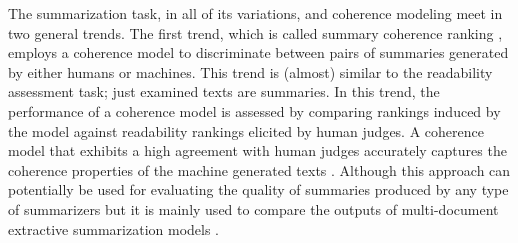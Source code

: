 The summarization task, in all of its variations, and coherence modeling meet in two general trends. 
The first trend, which is called summary coherence ranking \cite{barzilay08,guinaudeau13}, employs a coherence model to discriminate between pairs of summaries generated by either humans or machines. 
This trend is (almost) similar to the readability assessment task; just examined texts are summaries. 
In this trend, the performance of a coherence model is assessed by comparing rankings induced by the model against readability rankings elicited by human judges. 
A coherence model that exhibits a high agreement with human judges accurately captures the coherence properties of the machine generated texts \cite{barzilay08}. 
Although this approach can potentially be used for evaluating the quality of summaries produced by any type of summarizers but it is mainly used to compare the outputs of multi-document extractive summarization models \cite{barzilay08}. 

